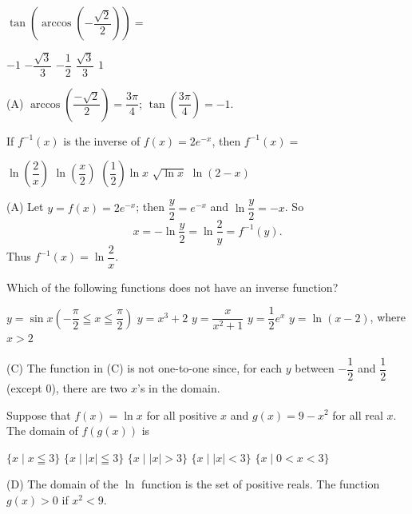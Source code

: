 \question
$\tan \left(\arccos \left(-\dfrac{\sqrt{2}}{2}\right)\right)=$
\begin{choices}
  \CorrectChoice $-1$
  \choice $-\dfrac{\sqrt{3}}{3}$
  \choice $-\dfrac{1}{2}$
  \choice $\dfrac{\sqrt{3}}{3}$
  \choice $1$
\end{choices}
\begin{solution}
(A) $\arccos \left(\dfrac{-\sqrt{2}}{2}\right)=\dfrac{3 \pi}{4}$; $\tan \left(\dfrac{3 \pi}{4}\right)=-1$.
\end{solution}




\newpage




\question
If $f^{-1}(x)$ is the inverse of $f(x)=2 e^{-x}$, then $f^{-1}(x)=$
\begin{choices}
  \CorrectChoice $\ln \left(\dfrac{2}{x}\right)$
  \choice $\ln \left(\dfrac{x}{2}\right)$
  \choice $\left(\dfrac{1}{2}\right) \ln x$
  \choice $\sqrt{\ln x}$
  \choice $\ln (2-x)$
\end{choices}
\begin{solution}
(A) Let $y=f(x)=2 e^{-x}$; then $\dfrac{y}{2}=e^{-x}$ and $\ln \dfrac{y}{2}=-x$. So
\[
x=-\ln \dfrac{y}{2}=\ln \dfrac{2}{y}=f^{-1}(y).
\]
Thus $f^{-1}(x)=\ln \dfrac{2}{x}$.
\end{solution}

\question
Which of the following functions does not have an inverse function?
\begin{choices}
  \choice $y=\sin x\left(-\dfrac{\pi}{2} \leqq x \leqq \dfrac{\pi}{2}\right)$
  \choice $y=x^{3}+2$
  \CorrectChoice $y=\dfrac{x}{x^{2}+1}$
  \choice $y=\dfrac{1}{2} e^{x}$
  \choice $y=\ln (x-2)$, where $x>2$
\end{choices}
\begin{solution}
(C) The function in (C) is not one-to-one since, for each $y$ between $-\dfrac{1}{2}$ and $\dfrac{1}{2}$ (except $0$), there are two $x$'s in the domain.
\end{solution}

\question\label{calc01:fg-domain}
Suppose that $f(x)=\ln x$ for all positive $x$ and $g(x)=9-x^{2}$ for all real $x$. The domain of $f(g(x))$ is
\begin{choices}
  \choice $\{x \mid x \leqq 3\}$
  \choice $\{x \mid |x| \leqq 3\}$
  \choice $\{x \mid |x|>3\}$
  \CorrectChoice $\{x \mid |x|<3\}$
  \choice $\{x \mid 0<x<3\}$
\end{choices}
\begin{solution}
(D) The domain of the $\ln$ function is the set of positive reals. The function $g(x)>0$ if $x^{2}<9$.
\end{solution}






